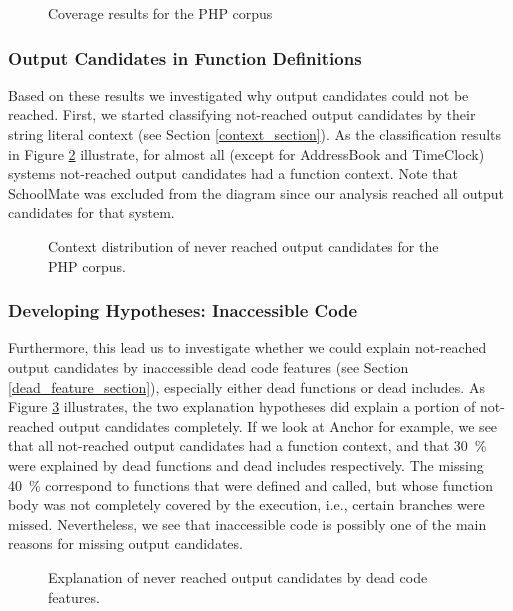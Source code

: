 \documentclass{sig-alternate-05-2015}
\begin{document}
\begin{figure}
	\centering	
		
	\caption{Coverage results for the PHP corpus}
	\label{coverage}
\end{figure}

\subsubsection{Output Candidates in Function Definitions}
Based on these results we investigated why output candidates could not be reached. First, we started classifying not-reached output candidates by their string literal context (see Section \ref{context_section}). As the classification results in Figure \ref{contexts} illustrate, for almost all (except for AddressBook and TimeClock) systems not-reached output candidates had a function context. Note that SchoolMate was excluded from the diagram since our analysis reached all output candidates for that system.

\begin{figure}
	
	\caption{Context distribution of never reached output candidates for the PHP
	corpus.}
	\label{contexts}
\end{figure}

\subsubsection{Developing Hypotheses: Inaccessible Code}
Furthermore, this lead us to investigate whether we could explain not-reached output candidates by inaccessible dead code features (see Section \ref{dead_feature_section}), especially either dead functions or dead includes. As Figure \ref{dead_explanations} illustrates, the two explanation hypotheses did explain a portion of not-reached output candidates completely. If we look at Anchor for example, we see that all not-reached output candidates had a function context, and that 30~\% were explained by dead functions and dead includes respectively. The missing 40~\% correspond to functions that were defined and called, but whose function body was not completely covered by the execution, i.e., certain branches were missed.
Nevertheless, we see that inaccessible code is possibly one of the main reasons for missing output candidates. 

\begin{figure}
	
	\caption{Explanation of never reached output candidates by dead code features.}
	\label{dead_explanations}
\end{figure}
\end{document}
